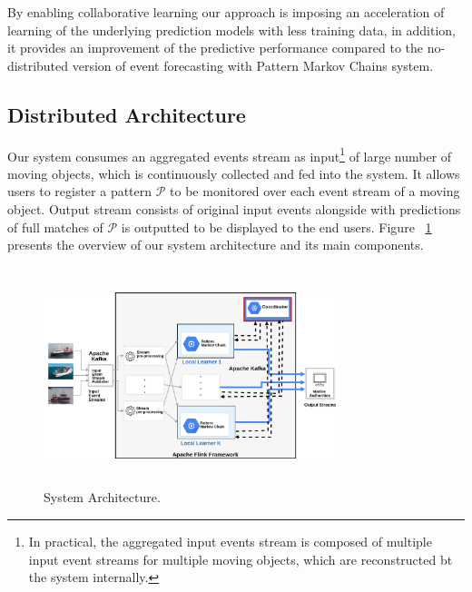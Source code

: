 \par By enabling collaborative learning our approach is imposing an acceleration of learning of the underlying prediction models with less training data, in addition, it provides an improvement of the predictive performance compared to the no-distributed  version of event forecasting with Pattern Markov Chains system. 


\subsection{Distributed Architecture}
\label{sec:architecture}
Our system consumes an aggregated events stream as input\footnote{In practical, the aggregated input events stream is composed of multiple input event streams for multiple moving objects, which are reconstructed bt the system internally.} of large number of moving objects, which is continuously collected and fed into the system. It allows users to register a pattern $\mathcal{P}$ to be monitored over each event stream of a moving object. Output stream consists of original input events alongside with predictions of full matches of $\mathcal{P}$ is outputted to be displayed to the end users. Figure ~\ref{fig:architecture} presents the overview of our system architecture and its main components.      


\begin{figure}[h]

\includegraphics[height=2.5in, width=3.4in]{figures/distributed_architecture.png}
	
\caption{System Architecture.}
\label{fig:architecture}
\end{figure}

